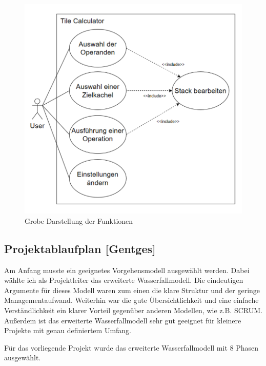 
\begin{figure}[h]
	\includegraphics[width=0.9\columnwidth]{img/funktionsumfang-grobe-darstellung-der-funktionen}
	\caption[Grobe Darstellung der Funktionen]{Grobe Darstellung der Funktionen\footnotemark}
\end{figure}


\subsection{Projektablaufplan [Gentges]}

Am Anfang musste ein geeignetes Vorgehensmodell ausgewählt werden. Dabei wählte ich als Projektleiter das erweiterte Wasserfallmodell. Die eindeutigen Argumente für dieses Modell waren zum einen die klare Struktur und der geringe Managementaufwand. Weiterhin war die gute Übersichtlichkeit und eine einfache Verständlichkeit ein klarer Vorteil gegenüber anderen Modellen, wie z.B. SCRUM. Außerdem ist das erweiterte Wasserfallmodell sehr gut geeignet für kleinere Projekte mit genau definiertem Umfang.

Für das vorliegende Projekt wurde das erweiterte Wasserfallmodell mit 8 Phasen ausgewählt. 

